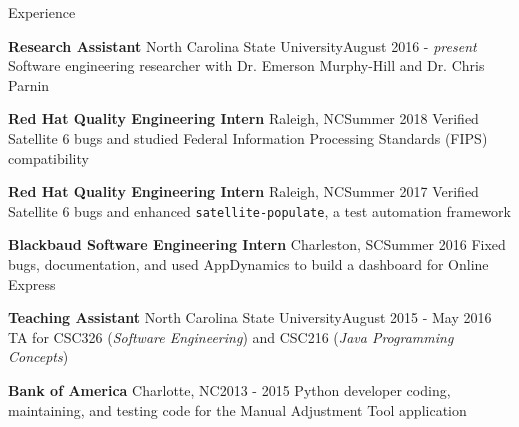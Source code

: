 \documentclass{resume} %
\begin{document}

\begin{rSection}{Experience}
\vspace{-4pt}

\begin{eSubsection}{\textbf{Research Assistant} North Carolina State University}{August 2016 - \textit{present}}
{Software engineering researcher with Dr. Emerson Murphy-Hill and Dr. Chris Parnin}
\end{eSubsection}
\vspace{-5pt}

\begin{eSubsection}{\textbf{Red Hat Quality Engineering Intern} Raleigh, NC}{Summer 2018}
{Verified Satellite 6 bugs and studied Federal Information Processing Standards (FIPS) compatibility}
\end{eSubsection}
\vspace{-5pt}

\begin{eSubsection}{\textbf{Red Hat Quality Engineering Intern} Raleigh, NC}{Summer 2017}
{Verified Satellite 6 bugs and enhanced \texttt{satellite-populate}, a test automation framework}
\end{eSubsection}

\vspace{-5pt}
\begin{eSubsection}{\textbf{Blackbaud Software Engineering Intern} Charleston, SC}{Summer 2016}
{Fixed bugs, documentation, and used AppDynamics to build a dashboard for Online Express}
\item 
\end{eSubsection}
\vspace{-5pt}

\begin{eSubsection}{\textbf{Teaching Assistant} North Carolina State University}{August 2015 - May 2016}
{TA for CSC326 (\textit{Software Engineering}) and CSC216 (\textit{Java Programming Concepts})}
\end{eSubsection}
\vspace{-5pt}

\begin{eSubsection}{\textbf{Bank of America} Charlotte, NC}{2013 - 2015}
{Python developer coding, maintaining, and testing code for the Manual Adjustment Tool application}
\item 
\end{eSubsection}
\vspace{-5pt}


\end{rSection}
\end{document}
